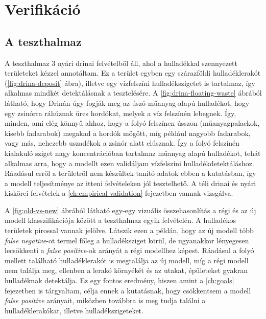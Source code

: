 \chapter {Verifikáció}
\label{ch:verification}

\section{A teszthalmaz}
\label{ch:test-set}

A teszthalmaz 3 nyári drinai felvételből áll, ahol a hulladékkal szennyezett területeket kézzel annotáltam. Ez a terület egyben egy szárazföldi hulladéklerakót (\ref{fig:drina-deposit} ábra), illetve egy vízfelszíni hulladékszigetet is tartalmaz, így alkalmas mindkét detektálásnak a tesztelésére. A \ref{fig:drina-floating-waste} ábrából látható, hogy Drinán úgy fogják meg az úszó műanyag-alapú hulladékot, hogy egy zsinórra ráhúznak üres hordókat, melyek a víz felszínén lebegnek. Így, minden, ami elég könnyű ahhoz, hogy a folyó felszínen ússzon (műanyagpalackok, kisebb fadarabok) megakad a hordók mögött, míg például nagyobb fadarabok, vagy más, nehezebb uszadékok a zsinór alatt elúsznak. Így a folyó felszínén kialakuló sziget nagy koncentrációban tartalmaz műanyag alapú hulladékot, tehát alkalmas arra, hogy a modellt ezen validáljam vízfelszíni hulladékdetektáláshoz. Ráadásul erről a területről nem készültek tanító adatok ebben a kutatásban, így a modell teljesítménye az itteni felvételeken jól tesztelhető. A téli drinai és nyári kiskörei felvételek a \ref{ch:empirical-validation} fejezetben vannak vizsgálva.

A \ref{fig:old-vs-new} ábrából látható egy-egy vizuális összehasonlítás a régi és az új modell klasszifikációja között a teszthalmaz egyik felvételén. A hulladékos területek pirossal vannak jelölve. Látszik ezen a példán, hogy az új modell több \textit{false negative}-ot termel főleg a hulladéksziget körül, de ugyanakkor lényegesen lecsökkenti a \textit{false positive}-ok arányát a régi modellhez képest. Ráadásul a folyó mellett található hulladéklerakót is megtalálja az új modell, míg a régi modell nem találja meg, ellenben a lerakó környékét és az utakat, épületeket gyakran hulladéknak detektálja. Ez egy fontos eredmény, hiszen amint a \ref{ch:goals} fejezetben is tárgyaltam, célja ennek a kutatásnak, hogy csökkentsem a modell \textit{false positive} arányait, miközben továbbra is meg tudja találni a hulladéklerakókat, illetve hulladékszigeteket.

